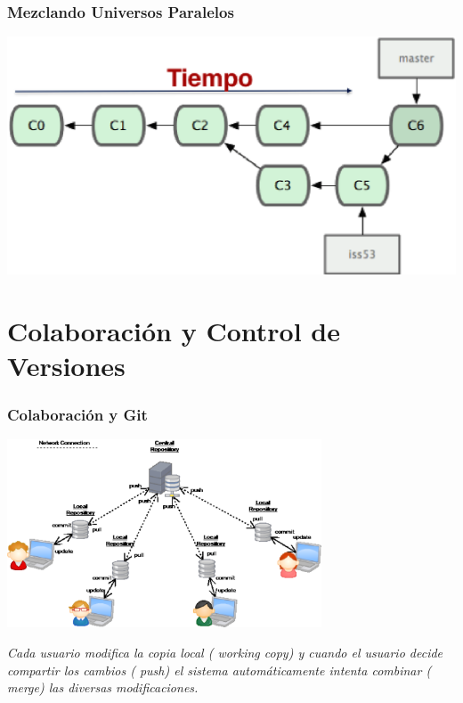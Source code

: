\documentclass{beamer}
\begin{document}
\begin{frame}
\frametitle{Mezclando Universos Paralelos}
\begin{center}
\includegraphics[width=1.0\textwidth]{img/merge.eps}
\end{center}
\end{frame}

\section{Colaboración y Control de Versiones}
\begin{frame}
\frametitle{Colaboración y Git}
\begin{center}
\includegraphics[width=0.7\textwidth]{img/collaborating1.eps}
\end{center}
{\it 
Cada usuario modifica la copia local ({\color{red} working copy}) 
y cuando el usuario decide
{\color{blue} compartir los cambios} ({\color{red} push}) 
el sistema automáticamente intenta {\color{blue}combinar} ({\color{red} merge})
las diversas modificaciones. 
}
\end{frame}
\end{document}
